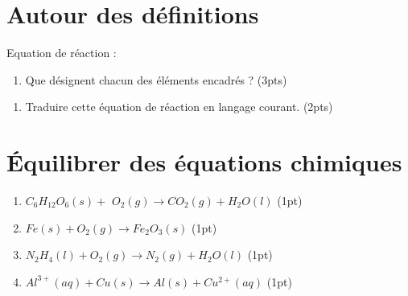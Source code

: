\documentclass[a4paper,11pt,fleqn]{scrartcl}%
\begin{document}
	\maketitle
	\section{Autour des définitions}
    Equation de réaction : 
     \fbox{$\rightarrow$} 
    \begin{enumerate}
        \item Que désignent chacun des éléments encadrés ? (3pts)
    \end{enumerate}
    \noindent\fbox{
    \begin{minipage}{\textwidth}
        \TextField[
            multiline=true,
            width=\linewidth,
            height=6em
        ]{}
    \end{minipage}
}
    \begin{enumerate}[resume]
        \item Traduire cette équation de réaction en langage courant. (2pts)
    \end{enumerate}
\noindent\fbox{
    \begin{minipage}{\textwidth}
        \TextField[
            multiline=true,
            width=\linewidth,
            height=6em
        ]{}
    \end{minipage}
}
    \section{Équilibrer des équations chimiques}
    \begin{enumerate}
        \item  \TextField[width=2em]{} $C_6H_{12}O_6(s) + $ \TextField[width=2em]{}$O_2(g) \rightarrow $\TextField[width=2em]{}$CO_2(g) + $\TextField[width=2em]{}$H_2O(l)$ (1pt)
        \item \TextField[width=2em]{}$Fe(s) + $\TextField[width=2em]{}$O_2(g) \rightarrow $\TextField[width=2em]{}$Fe_2O_3(s)$ (1pt)
        \item \TextField[width=2em]{}$N_2H_4(l) + $\TextField[width=2em]{}$O_2(g) \rightarrow $\TextField[width=2em]{}$N_2(g) + $\hspace{2em}$H_2O(l)$ (1pt)
        \item \TextField[width=2em]{}$Al^{3+}(aq) + $\TextField[width=2em]{}$Cu(s) \rightarrow $\TextField[width=2em]{}$Al(s) + $\TextField[width=2em]{}$Cu^{2+}(aq)$ (1pt)
    \end{enumerate}
\end{document}
